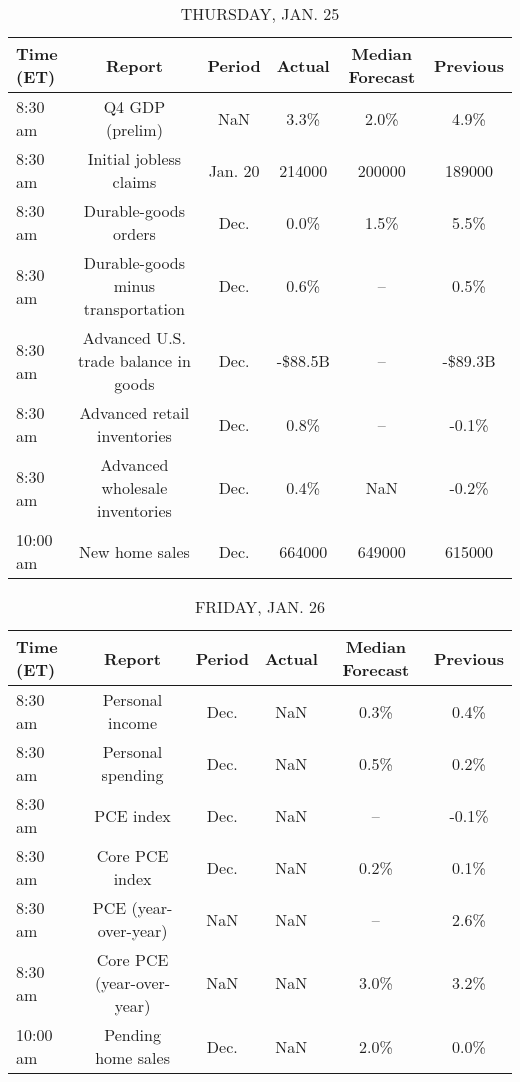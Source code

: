 \documentclass{article}%
\begin{document}
\begin{table}[htbp]%
\caption{THURSDAY, JAN. 25}%
\centering%
\begin{adjustbox}{width=1\textwidth}%
\begin{tabular}{lccccc}
\toprule
Time (ET) &                               Report &  Period &  Actual & Median Forecast & Previous \\
\midrule
  8:30 am &                      Q4 GDP (prelim) &     NaN &    3.3\% &            2.0\% &     4.9\% \\
  8:30 am &               Initial jobless claims & Jan. 20 &  214000 &          200000 &   189000 \\
  8:30 am &                 Durable-goods orders &    Dec. &    0.0\% &            1.5\% &     5.5\% \\
  8:30 am &   Durable-goods minus transportation &    Dec. &    0.6\% &              -- &     0.5\% \\
  8:30 am & Advanced U.S. trade balance in goods &    Dec. & -\$88.5B &              -- &  -\$89.3B \\
  8:30 am &          Advanced retail inventories &    Dec. &    0.8\% &              -- &    -0.1\% \\
  8:30 am &       Advanced wholesale inventories &    Dec. &    0.4\% &             NaN &    -0.2\% \\
 10:00 am &                       New home sales &    Dec. &  664000 &          649000 &   615000 \\
\bottomrule
\end{tabular}
%
\end{adjustbox}%
\end{table}

%


\begin{table}[htbp]%
\caption{FRIDAY, JAN. 26}%
\centering%
\begin{adjustbox}{width=1\textwidth}%
\begin{tabular}{lccccc}
\toprule
Time (ET) &                    Report & Period & Actual & Median Forecast & Previous \\
\midrule
  8:30 am &           Personal income &   Dec. &    NaN &            0.3\% &     0.4\% \\
  8:30 am &         Personal spending &   Dec. &    NaN &            0.5\% &     0.2\% \\
  8:30 am &                 PCE index &   Dec. &    NaN &              -- &    -0.1\% \\
  8:30 am &            Core PCE index &   Dec. &    NaN &            0.2\% &     0.1\% \\
  8:30 am &      PCE (year-over-year) &    NaN &    NaN &              -- &     2.6\% \\
  8:30 am & Core PCE (year-over-year) &    NaN &    NaN &            3.0\% &     3.2\% \\
 10:00 am &        Pending home sales &   Dec. &    NaN &            2.0\% &     0.0\% \\
\bottomrule
\end{tabular}
%
\end{adjustbox}%
\end{table}
\end{document}
